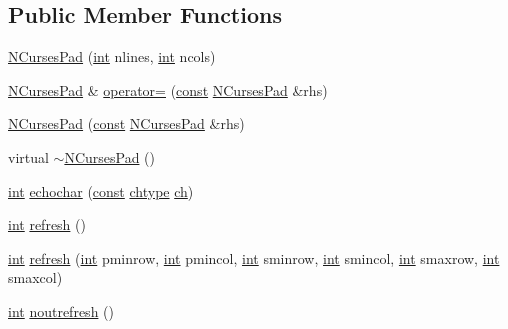\subsection*{Public Member Functions}
\begin{DoxyCompactItemize}
\item 
\hyperlink{class_n_curses_pad_ac4bdfeec38dd3cbd6d09ab8c69e33520}{N\-Curses\-Pad} (\hyperlink{term__entry_8h_ad65b480f8c8270356b45a9890f6499ae}{int} nlines, \hyperlink{term__entry_8h_ad65b480f8c8270356b45a9890f6499ae}{int} ncols)
\item 
\hyperlink{class_n_curses_pad}{N\-Curses\-Pad} \& \hyperlink{class_n_curses_pad_a5cb184c87578533d516d5a3f05ae4330}{operator=} (\hyperlink{term__entry_8h_a57bd63ce7f9a353488880e3de6692d5a}{const} \hyperlink{class_n_curses_pad}{N\-Curses\-Pad} \&rhs)
\item 
\hyperlink{class_n_curses_pad_a75511e015313923be78e99c21830b954}{N\-Curses\-Pad} (\hyperlink{term__entry_8h_a57bd63ce7f9a353488880e3de6692d5a}{const} \hyperlink{class_n_curses_pad}{N\-Curses\-Pad} \&rhs)
\item 
virtual \hyperlink{class_n_curses_pad_a529e680c08d5e000b229877390943624}{$\sim$\-N\-Curses\-Pad} ()
\item 
\hyperlink{term__entry_8h_ad65b480f8c8270356b45a9890f6499ae}{int} \hyperlink{class_n_curses_pad_a7e00fbd33f22b33f17e409313f5aaff9}{echochar} (\hyperlink{term__entry_8h_a57bd63ce7f9a353488880e3de6692d5a}{const} \hyperlink{curses_8priv_8h_ad21482314c581139d01159829e841e51}{chtype} \hyperlink{curses_8priv_8h_a49725d2659c0161681c55e3763942f68}{ch})
\item 
\hyperlink{term__entry_8h_ad65b480f8c8270356b45a9890f6499ae}{int} \hyperlink{class_n_curses_pad_a1c1943edcae1c3f802810818b0bb3f4f}{refresh} ()
\item 
\hyperlink{term__entry_8h_ad65b480f8c8270356b45a9890f6499ae}{int} \hyperlink{class_n_curses_pad_a4857cf3756c7b12b56de3aebe83b1c7c}{refresh} (\hyperlink{term__entry_8h_ad65b480f8c8270356b45a9890f6499ae}{int} pminrow, \hyperlink{term__entry_8h_ad65b480f8c8270356b45a9890f6499ae}{int} pmincol, \hyperlink{term__entry_8h_ad65b480f8c8270356b45a9890f6499ae}{int} sminrow, \hyperlink{term__entry_8h_ad65b480f8c8270356b45a9890f6499ae}{int} smincol, \hyperlink{term__entry_8h_ad65b480f8c8270356b45a9890f6499ae}{int} smaxrow, \hyperlink{term__entry_8h_ad65b480f8c8270356b45a9890f6499ae}{int} smaxcol)
\item 
\hyperlink{term__entry_8h_ad65b480f8c8270356b45a9890f6499ae}{int} \hyperlink{class_n_curses_pad_adb21093509cff7d62f340bf7a412e235}{noutrefresh} ()

\end{DoxyCompactItemize}
